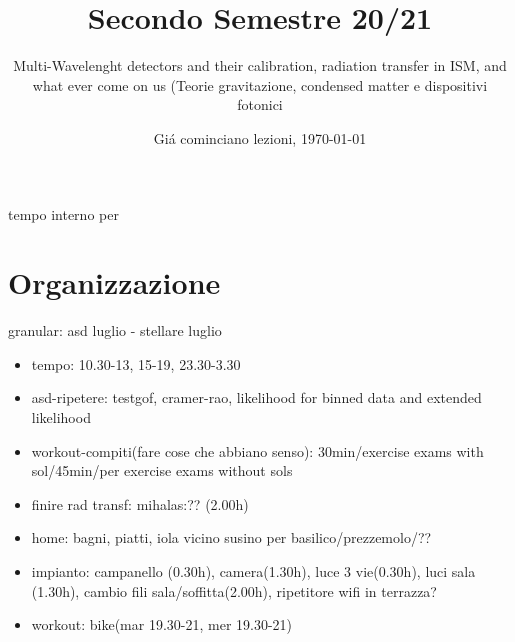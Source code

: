 \documentclass[10pt,xcolor={usenames},fleqn,mathserif,serif]{beamer}
\title{Secondo Semestre 20/21}
\subtitle{Multi-Wavelenght detectors and their calibration, radiation transfer in ISM, and what ever come on us (Teorie gravitazione, condensed matter e dispositivi fotonici}
\date{Gi\'a cominciano lezioni, \today}
\begin{document}


\begin{frame}
  \titlepage
\end{frame}

\begin{frame}{tempo interno per}
\tableofcontents[onlyparts]
\end{frame}


\part{Organizzazione}

\begin{frame}{granular: asd luglio - stellare luglio}
    \begin{itemize}
        \item tempo: 10.30-13, 15-19, 23.30-3.30
        \item asd-ripetere: testgof, cramer-rao, likelihood for binned data and extended likelihood
        \item workout-compiti(fare cose che abbiano senso): 30min/exercise exams with sol/45min/per exercise exams without sols
        \item finire rad transf: mihalas:?? (2.00h)
        \item home: bagni, piatti, iola vicino susino per basilico/prezzemolo/??
        \item impianto: campanello (0.30h), camera(1.30h), luce 3 vie(0.30h), luci sala (1.30h), cambio fili sala/soffitta(2.00h), ripetitore wifi in terrazza?
        \item workout: bike(mar 19.30-21, mer 19.30-21)
    \end{itemize}
\end{frame}
\end{document}
